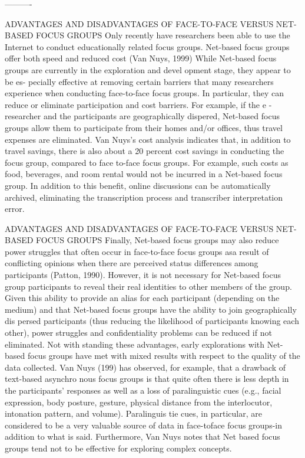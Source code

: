 \documentclass{beamer}
\begin{document}
----------
\begin{frame}{ADVANTAGES AND DISADVANTAGES OF FACE-TO-FACE VERSUS
NET-BASED FOCUS GROUPS }
Only recently have researchers been able to use the Internet to conduct educationally
related focus groups. Net-based focus groups offer both speed
and reduced cost (Van Nuys, 1999) While Net-based focus groups are currently
in the exploration and devel opment stage, they appear to be es-
pecially effective at removing certain barriers that many researchers experience
when conducting face-to-face focus groups. In particular, they
can reduce or eliminate participation and cost barriers. For example, if the
e -researcher and the participants are geographically dispered, Net-based focus
groups allow them to participate from their homes and/or offices, thus
travel expenses are eliminated. Van Nuys’s cost analysis indicates that, in
addition to travel savings, there is also about a 20 percent cost savings in
conducting the focus group, compared to face to-face focus groups. For example,
such costs as food, beverages, and room rental would not be incurred
in a Net-based focus group. In addition to this benefit, online discussions
can be automatically archived, eliminating the transcription process and
transcriber interpretation error.
\end{frame}

\begin{frame}{ADVANTAGES AND DISADVANTAGES OF FACE-TO-FACE VERSUS
NET-BASED FOCUS GROUPS }
Finally, Net-based focus groups may also reduce power struggles that
often occur in face-to-face focus groups asa result of conflicting opinions
when there are perceived status differences among participants (Patton,
1990). However, it is not necessary for Net-based focus group participants
to reveal their real identities to other members of the group. Given this
ability to provide an alias for each participant (depending on the medium)
and that Net-based focus groups have the ability to join geographically dis
persed participants (thus reducing the likelihood of participants knowing
each other), power struggles and confidentiality problems can be reduced
if not eliminated.
Not with standing these advantages, early explorations with Net-based
focus groups have met with mixed results with respect to the quality of
the data collected. Van Nuys (199) has observed, for example, that a
drawback of text-based asynchro nous focus groups is that quite often there
is less depth in the participants’ responses as well as a loss of paralinguistic
cues (e.g., facial expression, body posture, gesture, physical distance from
the interlocutor, intonation pattern, and volume). Paralinguis tie cues, in
particular, are considered to be a very valuable source of data in face-toface
focus groups-in addition to what is said. Furthermore, Van Nuys notes
that Net based focus groups tend not to be effective for exploring complex
concepts.
\end{frame}
\end{document}
